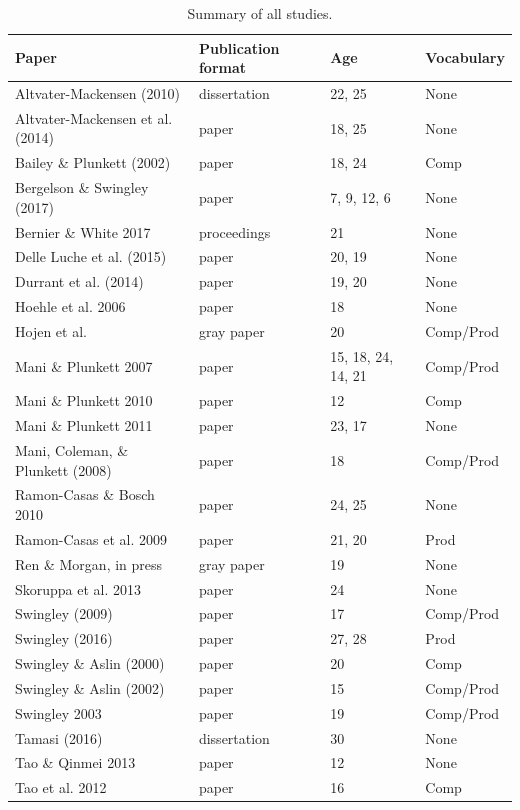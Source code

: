 \documentclass[man]{apa6}
\theoremstyle{definition}
\theoremstyle{definition}
\theoremstyle{definition}
\theoremstyle{remark}
\begin{document}
\begin{table}[tbp]
\begin{center}
\begin{threeparttable}
\caption{\label{tab:SummaryTable}Summary of all studies.}
\begin{tabular}{llll}
\toprule
Paper & Publication format & Age & Vocabulary\\
\midrule
Altvater-Mackensen (2010) & dissertation & 22, 25 & None\\
Altvater-Mackensen et al. (2014) & paper & 18, 25 & None\\
Bailey \& Plunkett (2002) & paper & 18, 24 & Comp\\
Bergelson \& Swingley (2017) & paper & 7, 9, 12, 6 & None\\
Bernier \& White 2017 & proceedings & 21 & None\\
Delle Luche et al. (2015) & paper & 20, 19 & None\\
Durrant et al. (2014) & paper & 19, 20 & None\\
Hoehle et al. 2006 & paper & 18 & None\\
Hojen et al. & gray paper & 20 & Comp/Prod\\
Mani \& Plunkett 2007 & paper & 15, 18, 24, 14, 21 & Comp/Prod\\
Mani \& Plunkett 2010 & paper & 12 & Comp\\
Mani \& Plunkett 2011 & paper & 23, 17 & None\\
Mani, Coleman, \& Plunkett (2008) & paper & 18 & Comp/Prod\\
Ramon-Casas \& Bosch 2010 & paper & 24, 25 & None\\
Ramon-Casas et al. 2009 & paper & 21, 20 & Prod\\
Ren \& Morgan, in press & gray paper & 19 & None\\
Skoruppa et al. 2013 & paper & 24 & None\\
Swingley (2009) & paper & 17 & Comp/Prod\\
Swingley (2016) & paper & 27, 28 & Prod\\
Swingley \& Aslin (2000) & paper & 20 & Comp\\
Swingley \& Aslin (2002) & paper & 15 & Comp/Prod\\
Swingley 2003 & paper & 19 & Comp/Prod\\
Tamasi (2016) & dissertation & 30 & None\\
Tao \& Qinmei 2013 & paper & 12 & None\\
Tao et al. 2012 & paper & 16 & Comp\\

\end{tabular}
\end{threeparttable}
\end{center}
\end{table}
\end{document}
